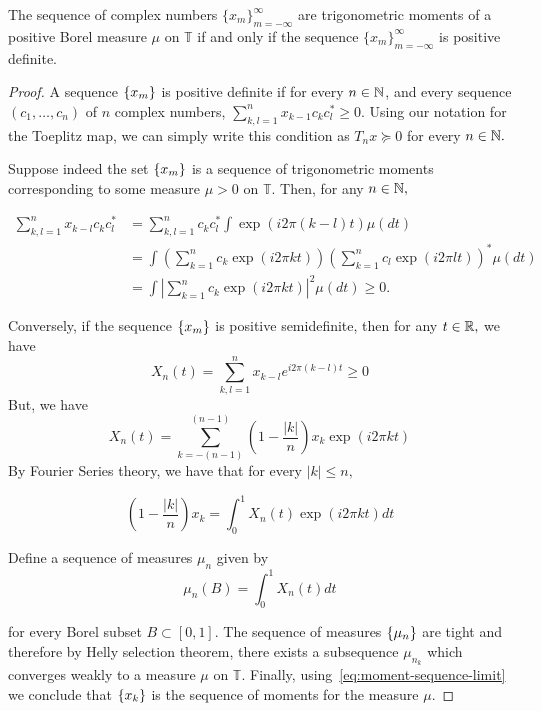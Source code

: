 \begin{theorem}\label{thm:herglotz}
	The sequence of complex numbers $\{x_m\}_{m=-\infty}^{\infty}$ are
trigonometric moments of a positive Borel measure $\mu$ on $\mathbb{T}$ if and
only if the sequence $\{x_m\}_{m=-\infty}^{\infty}$ is positive definite.
\end{theorem}

\begin{proof}

A sequence $\left\{ x_m \right\}$ is positive definite if for every $n \in \mathbb{N}$, and every
sequence $(c_1, \ldots, c_n)$ of $n$ complex numbers, $\sum_{k,l=1}^n x_{k-1}
c_k c_l^* \geq 0.$ Using our notation for the Toeplitz map, we can simply write
this condition as $T_n x \succeq 0$ for every $n \in \mathbb{N}.$

Suppose indeed the set $\left\{ x_m \right\}$ is a sequence of trigonometric moments
corresponding to some measure $\mu > 0$ on $\mathbb{T}.$ Then, for any $n \in
\mathbb{N},$

\begin{align*}
	\sum_{k,l=1}^n x_{k-l} c_k c_l^* &= \sum_{k,l=1}^n c_k c_l^* \int \exp(i 2 \pi (k-l) t ) \mu (dt)\\
	&= \int \left(\sum_{k=1}^n c_k \exp(i 2 \pi k t) \right) \left(\sum_{k=1}^n c_l \exp(i 2 \pi l t) \right)^* \mu (dt) \\
	&= \int \left|\sum_{k=1}^n c_k \exp(i 2 \pi k t) \right|^2 \mu (dt) \geq 0.
\end{align*}

Conversely, if the sequence $\left\{ x_m \right\}$ is positive semidefinite, then for any $t \in \mathbb{R},$  we have
\[
X_n(t) = \sum_{k,l=1}^n x_{k-l} e^{i 2 \pi (k-l) t} \geq 0
\]
But, we have
\[
	X_n(t) = \sum_{k=-(n-1)}^{(n-1)} \left( 1 - \frac{|k|}{n}\right) x_k \exp(i 2\pi k t)
\]
By Fourier Series theory, we have that for every $|k| \leq n,$

\begin{equation}
	\label{eq:moment-sequence-limit}
	\left( 1 - \frac{|k|}{n} \right) x_k = \int_0^1 X_n(t) \exp(i 2\pi k t ) d t
\end{equation}

Define a sequence of measures $\mu_n$ given by
\[
	\mu_n(B) = \int_0^1 X_n(t) d t
\]

for every Borel subset $B \subset [0,1].$ The sequence of measures $\left\{ \mu_n \right\}$
are tight and therefore by Helly selection theorem, there exists a subsequence
$\mu_{n_k}$ which converges weakly to a measure $\mu$ on $\mathbb{T}.$ Finally, using~\ref{eq:moment-sequence-limit} we conclude that $\left\{ x_k \right\}$ is the sequence of moments for the measure $\mu.$
\end{proof}

